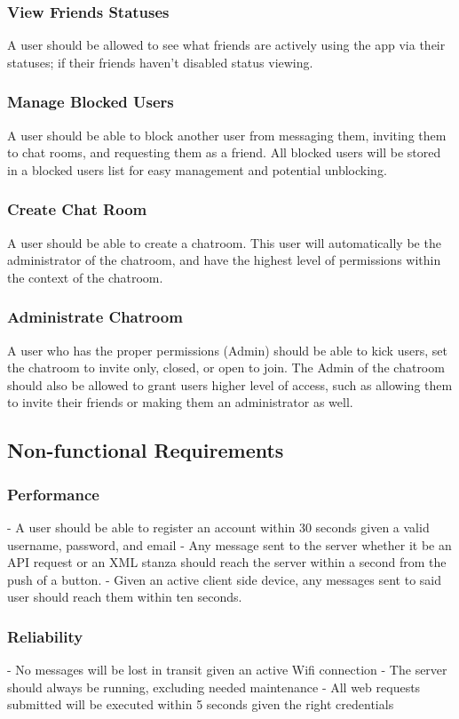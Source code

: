 \documentclass[11pt]{article}
\theoremstyle{plain}
\theoremstyle{definition}
\begin{document}
\subsubsection{View Friends Statuses}
A user should be allowed to see what friends are actively using the app via their statuses; if their friends haven't disabled status viewing. 
\subsubsection{Manage Blocked Users}
A user should be able to block another user from messaging them, inviting them to chat rooms, and requesting them as a friend. All blocked users will be stored in a blocked users list for easy management and potential unblocking. 
\subsubsection{Create Chat Room}
A user should be able to create a chatroom. This user will automatically be the administrator of the chatroom, and have the highest level of permissions within the context of the chatroom.
\subsubsection{Administrate Chatroom}
A user who has the proper permissions (Admin) should be able to kick users, set the chatroom to invite only, closed, or open to join. The Admin of the chatroom should also be allowed to grant users higher level of access, such as allowing them to invite their friends or making them an administrator as well.

\subsection{Non-functional Requirements}\label{sec:nonfuncrequirements}
\subsubsection{Performance}
- A user should be able to register an account within 30 seconds given a valid username, 
  password, and email
- Any message sent to the server whether it be an API request or an XML stanza should reach 
  the server within a second from the push of a button.
- Given an active client side device, any messages sent to said user should reach them 
  within ten seconds.
\subsubsection{Reliability}
- No messages will be lost in transit given an active Wifi connection
- The server should always be running, excluding needed maintenance
- All web requests submitted will be executed within 5 seconds given the right 
  credentials
\end{document}
